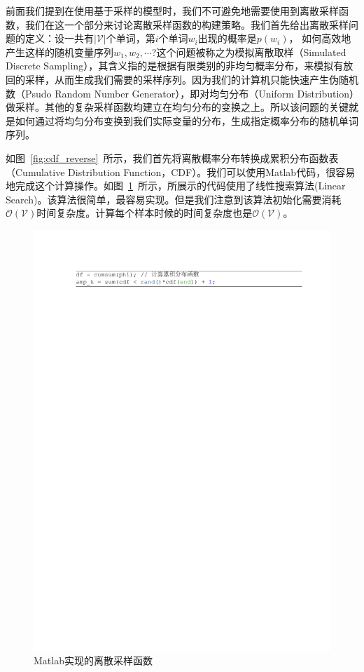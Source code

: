 前面我们提到在使用基于采样的模型时，我们不可避免地需要使用到离散采样函数，我们在这一个部分来讨论离散采样函数的构建策略。我们首先给出离散采样问题的定义：设一共有$|\mathcal{V}|$个单词，第$i$个单词$w_i$出现的概率是$p(w_i)$， 如何高效地产生这样的随机变量序列$w_1,w_2,\cdots$?这个问题被称之为模拟离散取样（Simulated Discrete Sampling），其含义指的是根据有限类别的非均匀概率分布，来模拟有放回的采样，从而生成我们需要的采样序列。因为我们的计算机只能快速产生伪随机数（Psudo Random Number Generator），即对均匀分布（Uniform Distribution）做采样。其他的复杂采样函数均建立在均匀分布的变换之上。所以该问题的关键就是如何通过将均匀分布变换到我们实际变量的分布，生成指定概率分布的随机单词序列。

如图~\ref{fig:cdf_reverse}~所示，我们首先将离散概率分布转换成累积分布函数表（Cumulative Distribution Function，CDF）。我们可以使用Matlab代码，很容易地完成这个计算操作。如图~\ref{fig:sample}~所示，所展示的代码使用了线性搜索算法(Linear Search)。该算法很简单，最容易实现。但是我们注意到该算法初始化需要消耗$\mathcal{O(\mathcal{V})}$时间复杂度。计算每个样本时候的时间复杂度也是$\mathcal{O(V)}$。
\begin{figure}[!t]
  \centering
\includegraphics[width=1\linewidth]{./figures/cdf.pdf}
\caption{Matlab实现的离散采样函数}\label{fig:sample}
\end{figure}


